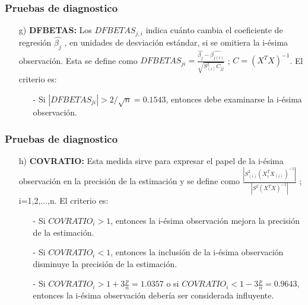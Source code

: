 \documentclass[12pt]{beamer}
\begin{document}
\begin{frame}
\frametitle{Pruebas de diagnostico}
\begin{itemize}
\item[g)] \textbf{DFBETAS:} Los $DFBETAS_{j,i}$ indica cuánto cambia el coeficiente de regresión $\hat{\beta_{j}}$ , en unidades de desviación estándar, si se omitiera la i-ésima observación. Esta se define como $DFBETAS_{ji}=\frac{\hat{\beta_{j}}-\hat{\beta_{j(i)}}}{\sqrt{S^{2}_{(i)}C_{jj}}}$ ; $C=(X^{T}X)^{-1}$. El criterio es:
\begin{itemize}
\item[-] Si $|DFBETAS_{ji}|>2/\sqrt{n}=0.1543$, entonces debe examinarse la i-ésima observación.
\end{itemize}
\end{itemize}
\end{frame}

\begin{frame}
\frametitle{Pruebas de diagnostico}
\begin{itemize}
\item[h)] \textbf{COVRATIO:} Esta medida sirve para expresar el papel de la i-ésima observación en la precisión de la estimación y se define como $\frac{|S^{2}_{(i)}(X^{T}_{i}X_{(i)})^{-1}|}{|S^{2}(X^{T}X)^{-1}|} $ ; i=1,2,...,n. El criterio es:
\begin{itemize}
\item[-] Si $COVRATIO_{i}>1$, entonces la i-ésima observación mejora la precisión de la estimación.
\item[-] Si $COVRATIO_{i}<1$, entonces la inclusión de la i-ésima observación disminuye la precisión de la estimación.
\item[-] Si $COVRATIO_{i}>1+3\frac{p}{n}=1.0357$  o si $COVRATIO_{i}<1-3\frac{p}{n}=0.9643$, entonces la i-ésima observación debería ser considerada influyente. 
\end{itemize}
\end{itemize}
\end{frame}
\end{document}
